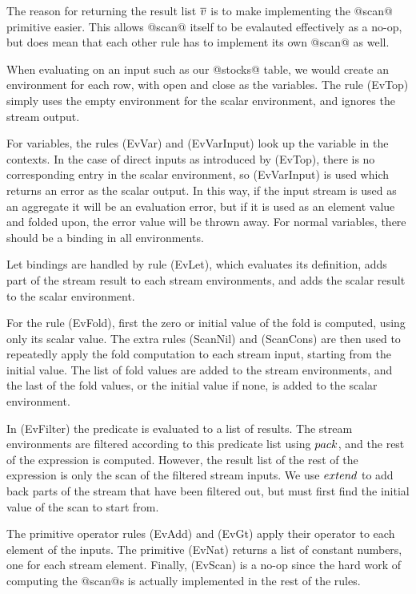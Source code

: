 The reason for returning the result list $\overline{v}$ is to make implementing the @scan@ primitive easier.
This allows @scan@ itself to be evalauted effectively as a no-op, but does mean that each other rule has to implement its own @scan@ as well.



When evaluating on an input such as our @stocks@ table, we would create an environment for each row, with open and close as the variables.
The rule (EvTop) simply uses the empty environment for the scalar environment, and ignores the stream output.

For variables, the rules (EvVar) and (EvVarInput) look up the variable in the contexts.
In the case of direct inputs as introduced by (EvTop), there is no corresponding entry in the scalar environment, so (EvVarInput) is used which returns an error as the scalar output.
In this way, if the input stream is used as an aggregate it will be an evaluation error, but if it is used as an element value and folded upon, the error value will be thrown away.
For normal variables, there should be a binding in all environments.

Let bindings are handled by rule (EvLet), which evaluates its definition, adds part of the stream result to each stream environments, and adds the scalar result to the scalar environment.

For the rule (EvFold), first the zero or initial value of the fold is computed, using only its scalar value.
The extra rules (ScanNil) and (ScanCons) are then used to repeatedly apply the fold computation to each stream input, starting from the initial value.
The list of fold values are added to the stream environments, and the last of the fold values, or the initial value if none, is added to the scalar environment.

In (EvFilter) the predicate is evaluated to a list of results. 
The stream environments are filtered according to this predicate list using $\mit{pack}$, and the rest of the expression is computed.
However, the result list of the rest of the expression is only the scan of the filtered stream inputs.
We use $\mit{extend}$ to add back parts of the stream that have been filtered out, but must first find the initial value of the scan to start from.

The primitive operator rules (EvAdd) and (EvGt) apply their operator to each element of the inputs.
The primitive (EvNat) returns a list of constant numbers, one for each stream element.
Finally, (EvScan) is a no-op since the hard work of computing the @scan@s is actually implemented in the rest of the rules.



